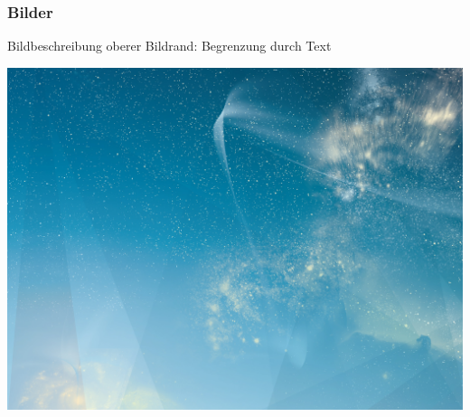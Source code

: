 \begin{frame}
    \frametitle{Bilder}

    Bildbeschreibung\newline
    oberer Bildrand: Begrenzung durch Text

\vspace*{-3mm}
\begin{minipage}[t][0cm]{\paperwidth}%
\hspace*{-\PraesentationSeitenrand}%
\includegraphics[width=\paperwidth]{./Ressourcen/_Bilder/SternenhimmelQuer.jpg}
\end{minipage}

\end{frame}
\clearpage


